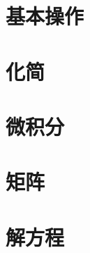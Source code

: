 \section{基本操作}








\section{化简}












\section{微积分}




\section{矩阵}

















\section{解方程}



